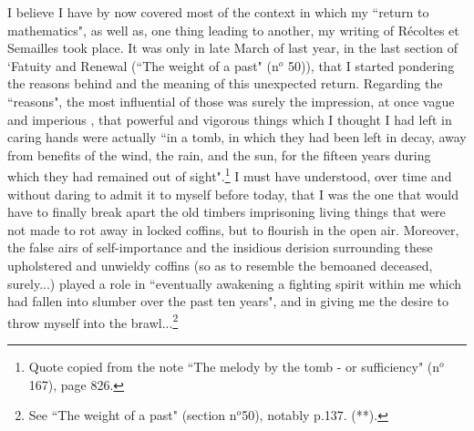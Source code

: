 I believe I have by now covered most of the context in which my ``return to mathematics", as well as, one thing leading to another, my writing of R\'ecoltes et Semailles took place. It was only in late March of last year, in the last section of `Fatuity and Renewal (``The weight of a past" (n$^o$ 50)), that I started pondering the reasons behind and the meaning of this unexpected return.
Regarding the ``reasons", the most influential of those was surely the impression, at once vague and imperious , that powerful and vigorous things which I thought I had left in caring hands were actually ``in a tomb, in which they had been left in decay, away from benefits of the wind, the rain, and the sun, for the fifteen years during which they had remained out of sight".\footnote{Quote copied from the note ``The melody by the tomb - or sufficiency" (n$^o$167), page 826.}
I must have understood, over time and without daring to admit it to myself before today, that I was the one that would have to finally break apart the old timbers imprisoning living things that were not made to rot away in locked coffins, but to flourish in the open air. Moreover, the false airs of self-importance and the insidious derision surrounding these upholstered and unwieldy coffins (so as to resemble the bemoaned deceased, surely...) played a role in ``eventually awakening a fighting spirit within me which had fallen into slumber over the past ten years", and in giving me the desire to throw myself into the brawl...\footnote{See ``The weight of a past" (section n$^o$50), notably p.137. (**).}

